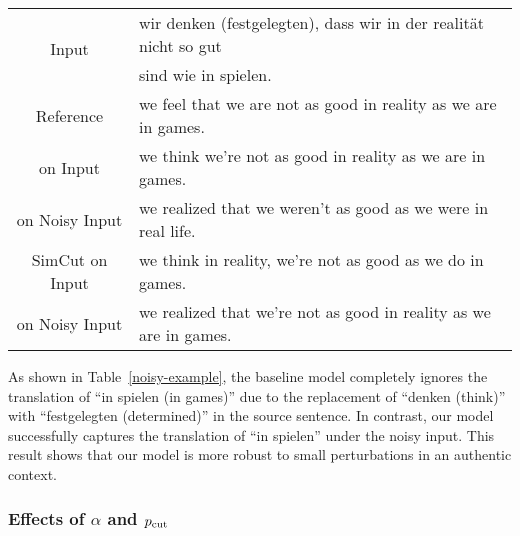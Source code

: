 \documentclass[11pt]{article}
\begin{document}
\begin{table*}
\centering
\begin{tabular}{c|l}
\hline
\multirow{2}{*}{Input} & wir denken ({\color{red}festgelegten}), dass wir in der realität nicht so gut \\
 & sind wie in spielen. \\
\hline
Reference & we feel that we are not as good in reality as we are in games. \\
\hline
\hline
\citet{vaswani2017attention} on Input & we think we're not as good in reality as we are in games. \\
\hline
on Noisy Input & we realized that we weren't as good as we were in real life. \\
\hline
\hline
SimCut on Input & we think in reality, we're not as good as we do in games. \\
\hline
on Noisy Input & we realized that we're not as good in reality as we are in games.\\
\hline
\end{tabular}
\caption{\label{noisy-example}
SimCut is more robust to small perturbations in an authentic context. SimCut captures the translation of ``in spielen'' under the noisy input while the vanilla Transformer ignores the translation of ``in spielen'' due to the replacement of ``denken'' with ``festgelegten''.
}
\end{table*}

As shown in Table~\ref{noisy-example}, the baseline model completely ignores the translation of ``in spielen (in games)'' due to the replacement of ``denken (think)'' with ``festgelegten (determined)'' in the source sentence. In contrast, our model successfully captures the translation of ``in spielen'' under the noisy input. This result shows that our model is more robust to small perturbations in an authentic context.

\subsubsection{Effects of $\alpha$ and $p_{\rm cut}$}
\end{document}
